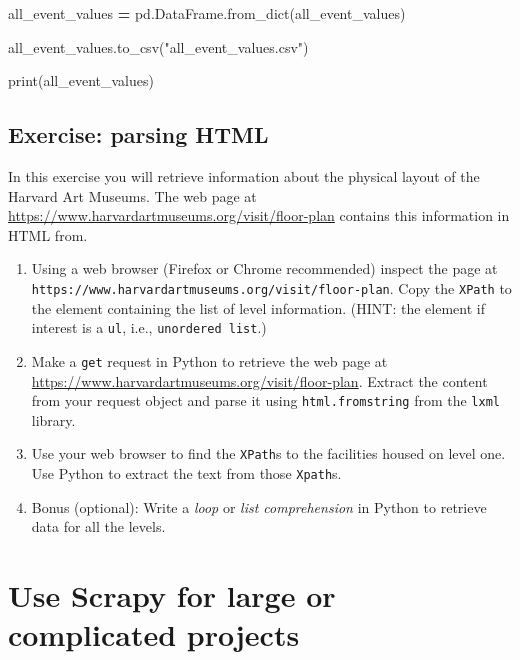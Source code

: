\documentclass[]{book}
\newenvironment{Shaded}{\begin{snugshade}}{\end{snugshade}}
\newcommand{\StringTok}[1]{\textcolor[rgb]{0.31,0.60,0.02}{#1}}
\newcommand{\OperatorTok}[1]{\textcolor[rgb]{0.81,0.36,0.00}{\textbf{#1}}}
\newcommand{\BuiltInTok}[1]{#1}
\newcommand{\NormalTok}[1]{#1}
\providecommand{\tightlist}{%
  \setlength{\itemsep}{0pt}\setlength{\parskip}{0pt}}
\begin{document}
\begin{Shaded}
\begin{Highlighting}[]
\NormalTok{all_event_values }\OperatorTok{=}\NormalTok{ pd.DataFrame.from_dict(all_event_values)}

\NormalTok{all_event_values.to_csv(}\StringTok{"all_event_values.csv"}\NormalTok{)}

\BuiltInTok{print}\NormalTok{(all_event_values)}
\end{Highlighting}
\end{Shaded}

\subsection{Exercise: parsing HTML}\label{exercise-parsing-html}

In this exercise you will retrieve information about the physical layout
of the Harvard Art Museums. The web page at
\url{https://www.harvardartmuseums.org/visit/floor-plan} contains this
information in HTML from.

\begin{enumerate}
\def\labelenumi{\arabic{enumi}.}
\tightlist
\item
  Using a web browser (Firefox or Chrome recommended) inspect the page
  at \texttt{https://www.harvardartmuseums.org/visit/floor-plan}. Copy
  the \texttt{XPath} to the element containing the list of level
  information. (HINT: the element if interest is a \texttt{ul}, i.e.,
  \texttt{unordered\ list}.)
\item
  Make a \texttt{get} request in Python to retrieve the web page at
  \url{https://www.harvardartmuseums.org/visit/floor-plan}. Extract the
  content from your request object and parse it using
  \texttt{html.fromstring} from the \texttt{lxml} library.
\item
  Use your web browser to find the \texttt{XPath}s to the facilities
  housed on level one. Use Python to extract the text from those
  \texttt{Xpath}s.
\item
  Bonus (optional): Write a \emph{loop} or \emph{list comprehension} in
  Python to retrieve data for all the levels.
\end{enumerate}

\section{Use Scrapy for large or complicated
projects}\label{use-scrapy-for-large-or-complicated-projects}
\end{document}

